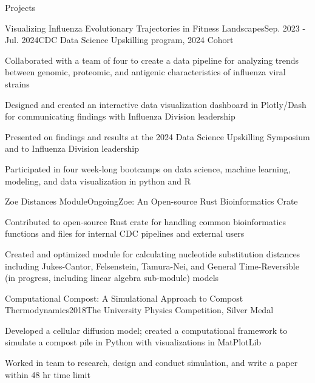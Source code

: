 \documentclass{resume} %
\begin{document}
\begin{rSection}{Projects}
  \begin{rSubsection}{Visualizing Influenza Evolutionary Trajectories in Fitness Landscapes}{Sep. 2023 - Jul. 2024}{CDC Data Science Upskilling program, 2024 Cohort}{}
  \item Collaborated with a team of four to create a data pipeline for analyzing trends between genomic, proteomic, and antigenic characteristics of influenza viral strains
  \item Designed and created an interactive data visualization dashboard in Plotly/Dash for communicating findings with Influenza Division leadership
  \item Presented on findings and results at the 2024 Data Science Upskilling Symposium and to Influenza Division leadership
  \item Participated in four week-long bootcamps on data science, machine learning, modeling, and data visualization in python and R
  \end{rSubsection}

  \begin{rSubsection}{Zoe Distances Module}{Ongoing}{Zoe: An Open-source Rust Bioinformatics Crate}{}
  \item Contributed to open-source Rust crate for handling common bioinformatics functions and files for internal CDC pipelines and external users
  \item Created and optimized module for calculating nucleotide substitution distances including Jukes-Cantor, Felsenstein, Tamura-Nei, and General Time-Reversible (in progress, including linear algebra sub-module) models
  \end{rSubsection}

  \begin{rSubsection}{Computational Compost: A Simulational Approach to Compost Thermodynamics}{2018}{The University Physics Competition, Silver Medal}{}
  \item Developed a cellular diffusion model; created a computational framework to simulate a compost pile in Python with visualizations in MatPlotLib
  \item Worked in team to research, design and conduct simulation, and write a paper within 48 hr time limit
  \end{rSubsection}


\end{rSection}
\end{document}
